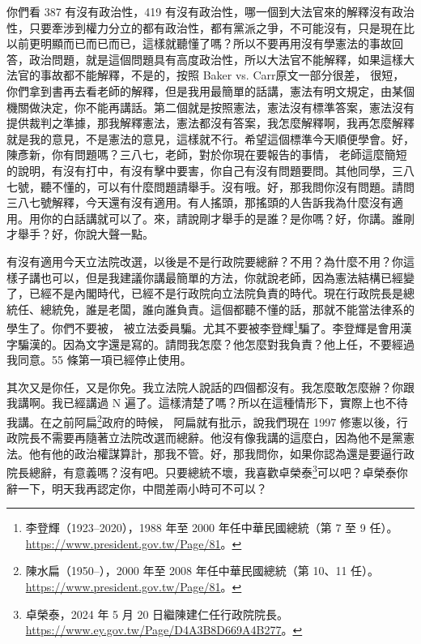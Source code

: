 \hypertarget{c08:cue:42}{}你們看 387 有沒有政治性，419 有沒有政治性，哪一個到大法官來的解釋沒有政治性，只要牽涉到權力分立的都有政治性，都有黨派之爭，不可能沒有，只是現在比以前更明顯而已而已而已，這樣就聽懂了嗎？所以不要再用沒有學憲法的事故回答，政治問題，就是這個問題具有高度政治性，所以大法官不能解釋，如果這樣大法官的事故都不能解釋，不是的，按照 Baker vs. Carr原文一部分很差，
\hypertarget{c08:cue:43}{}很短，你們拿到書再去看老師的解釋，但是我用最簡單的話講，憲法有明文規定，由某個機關做決定，你不能再講話。第二個就是按照憲法，憲法沒有標準答案，憲法沒有提供裁判之準據，那我解釋憲法，憲法都沒有答案，我怎麼解釋啊，我再怎麼解釋就是我的意見，不是憲法的意見，這樣就不行。希望這個標準今天順便學會。好，陳彥新，你有問題嗎？三八七，老師，對於你現在要報告的事情，
\hypertarget{c08:cue:44}{}老師這麼簡短的說明，有沒有打中，有沒有擊中要害，你自己有沒有問題要問。其他同學，三八七號，聽不懂的，可以有什麼問題請舉手。沒有哦。好，那我問你沒有問題。請問三八七號解釋，今天還有沒有適用。有人搖頭，那搖頭的人告訴我為什麼沒有適用。用你的白話講就可以了。來，請說剛才舉手的是誰？是你嗎？好，你講。誰剛才舉手？好，你說大聲一點。

\hypertarget{c08:cue:45}{}有沒有適用今天立法院改選，以後是不是行政院要總辭？不用？為什麼不用？你這樣子講也可以，但是我建議你講最簡單的方法，你就說老師，因為憲法結構已經變了，已經不是內閣時代，已經不是行政院向立法院負責的時代。現在行政院長是總統任、總統免，誰是老闆，誰向誰負責。這個都聽不懂的話，那就不能當法律系的學生了。你們不要被，
\hypertarget{c08:cue:46}{}被立法委員騙。尤其不要被李登輝\footnote{李登輝（1923–2020），1988 年至 2000 年任中華民國總統（第 7 至 9 任）。\url{https://www.president.gov.tw/Page/81}。}騙了。李登輝是會用漢字騙漢的。因為文字還是寫的。請問我怎麼？他怎麼對我負責？他上任，不要經過我同意。55 條第一項已經停止使用。

\hypertarget{c08:cue:47}{}其次又是你任，又是你免。我立法院人說話的四個都沒有。我怎麼敢怎麼辦？你跟我講啊。我已經講過 N 遍了。這樣清楚了嗎？所以在這種情形下，實際上也不待我講。在之前阿扁\footnote{陳水扁（1950–），2000 年至 2008 年任中華民國總統（第 10、11 任）。\url{https://www.president.gov.tw/Page/81}。}政府的時候，
\hypertarget{c08:cue:48}{}阿扁就有批示，說我們現在 1997 修憲以後，行政院長不需要再隨著立法院改選而總辭。他沒有像我講的這麼白，因為他不是黨憲法。他有他的政治權謀算計，那我不管。好，那我問你，如果你認為還是要逼行政院長總辭，有意義嗎？沒有吧。只要總統不壞，我喜歡卓榮泰\footnote{卓榮泰，2024 年 5 月 20 日繼陳建仁任行政院院長。\url{https://www.ey.gov.tw/Page/D4A3B8D669A4B277}。}可以吧？卓榮泰你辭一下，明天我再認定你，中間差兩小時可不可以？

